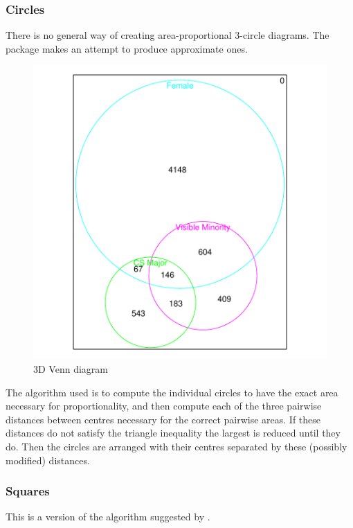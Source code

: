 \documentclass[a4paper]{article}
\begin{document}
\subsubsection{Circles}
There is no general way of creating area-proportional
3-circle diagrams. The package makes an attempt
to produce approximate ones.
\begin{figure}[H]
  \begin{center}
\includegraphics{Vennfig-ccomboutransp}
  \caption{ 3D Venn diagram }
  \end{center}
\end{figure}
The algorithm used is to compute the individual circles to have the exact area necessary
for proportionality, and then compute each of the three pairwise distances
between centres necessary for the correct pairwise areas. If these distances do not satisfy the triangle inequality
the largest is reduced until they do. Then the circles are arranged with their centres
separated by these (possibly modified) distances.



\newpage

\subsubsection{Squares}
This is a version of the algorithm suggested by \citet{chowruskey:2003}.
\end{document}
